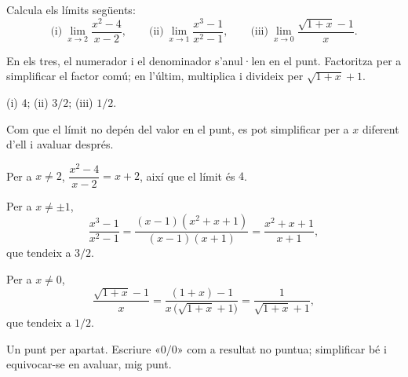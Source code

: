 
\begin{exercise}
Calcula els límits següents:
\[
  \text{(i)}\ \lim_{x \to 2} \frac{x^2 - 4}{x - 2} ,
  \qquad
  \text{(ii)}\ \lim_{x \to 1} \frac{x^3 - 1}{x^2 - 1} ,
  \qquad
  \text{(iii)}\ \lim_{x \to 0} \frac{\sqrt{1 + x} - 1}{x} .
\]


\begin{hint}
En els tres, el numerador i el denominador s'anul·len en el punt. Factoritza
per a simplificar el factor comú; en l'últim, multiplica i divideix per
$\sqrt{1 + x} + 1$.
\end{hint}

\begin{answer}
(i) $4$; (ii) $3/2$; (iii) $1/2$.
\end{answer}

\begin{solution}
Com que el límit no depén del valor en el punt, es pot simplificar per a $x$
diferent d'ell i avaluar després.
\begin{parts}
  \item Per a $x \neq 2$, $\dfrac{x^2 - 4}{x - 2} = x + 2$, així que el
        límit és $4$.
  \item Per a $x \neq \pm 1$,
        \[
          \frac{x^3 - 1}{x^2 - 1}
          = \frac{(x - 1)(x^2 + x + 1)}{(x - 1)(x + 1)}
          = \frac{x^2 + x + 1}{x + 1} ,
        \]
        que tendeix a $3/2$.
  \item Per a $x \neq 0$,
        \[
          \frac{\sqrt{1 + x} - 1}{x}
          = \frac{(1 + x) - 1}{x\,\bigl(\sqrt{1 + x} + 1\bigr)}
          = \frac{1}{\sqrt{1 + x} + 1} ,
        \]
        que tendeix a $1/2$.
\end{parts}
\end{solution}

\begin{marking}
Un punt per apartat. Escriure «$0/0$» com a resultat no puntua; simplificar
bé i equivocar-se en avaluar, mig punt.
\end{marking}
\end{exercise}
